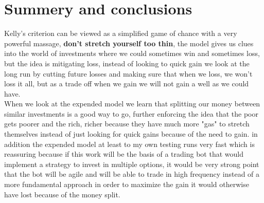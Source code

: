 \documentclass{article}
\begin{document}
	\section{Summery and conclusions}
	Kelly's criterion can be viewed as a simplified game of chance with a very powerful massage, 
	\textbf{don't stretch yourself too thin}, the model gives us clues into the world of investments where we could sometimes win and sometimes loss, but the idea is mitigating loss, instead of looking to quick gain we look at the long run by cutting future losses and making sure that when we loss, we won't loss it all, but as a trade off when we gain we will not gain a well as we could have.\\
	When we look at the expended model we learn that splitting our money between similar investments is a good way to go, further enforcing the idea that the poor gets poorer and the rich, richer because they have much \cite{Feng8388} \cite{SQP}
	\cite{matlab} more "gas" to stretch themselves instead of just looking for quick gains because of the need to gain. in addition the expended model at least to my own testing runs very fast which is reassuring because if this work will be the basis of a trading bot that would implement a strategy to invest in multiple options, it would be very strong point that the bot will be agile and will be able to trade in high frequency instead of a more fundamental approach in order to maximize the gain it would otherwise have lost because of the money split.
	\newpage
	\printbibliography[
	heading=bibintoc,
	title={References}
	]
\end{document}
